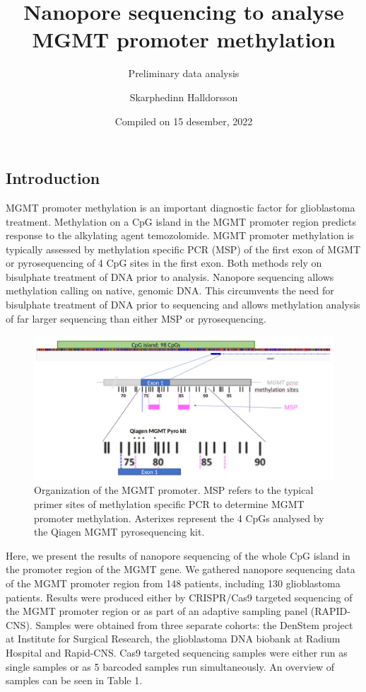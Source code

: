 \documentclass[
]{article}
\title{Nanopore sequencing to analyse MGMT promoter methylation}
\subtitle{Preliminary data analysis}
\author{Skarphedinn Halldorsson}
\date{Compiled on 15 desember, 2022}
\begin{document}
\maketitle

\hypertarget{introduction}{%
\subsection{Introduction}\label{introduction}}

MGMT promoter methylation is an important diagnostic factor for
glioblastoma treatment. Methylation on a CpG island in the MGMT promoter
region predicts response to the alkylating agent temozolomide. MGMT
promoter methylation is typically assessed by methylation specific PCR
(MSP) of the first exon of MGMT or pyrosequencing of 4 CpG sites in the
first exon. Both methods rely on bisulphate treatment of DNA prior to
analysis. Nanopore sequencing allows methylation calling on native,
genomic DNA. This circumvents the need for bisulphate treatment of DNA
prior to sequencing and allows methylation analysis of far larger
sequencing than either MSP or pyrosequencing.

\begin{figure}
\includegraphics[width=1\linewidth]{Figures/MGMT_promoter_region} \caption{Organization of the MGMT promoter. MSP refers to the typical primer sites of methylation specific PCR to determine MGMT promoter methylation. Asterixes represent the 4 CpGs analysed by the Qiagen MGMT pyrosequencing kit.}\label{fig:Promoter}
\end{figure}

Here, we present the results of nanopore sequencing of the whole CpG
island in the promoter region of the MGMT gene. We gathered nanopore
sequencing data of the MGMT promoter region from 148 patients, including
130 glioblastoma patients. Results were produced either by CRISPR/Cas9
targeted sequencing of the MGMT promoter region or as part of an
adaptive sampling panel (RAPID-CNS). Samples were obtained from three
separate cohorts: the DenStem project at Institute for Surgical
Research, the glioblastoma DNA biobank at Radium Hospital and Rapid-CNS.
Cas9 targeted sequencing samples were either run as single samples or as
5 barcoded samples run simultaneously. An overview of samples can be
seen in Table 1.
\end{document}
